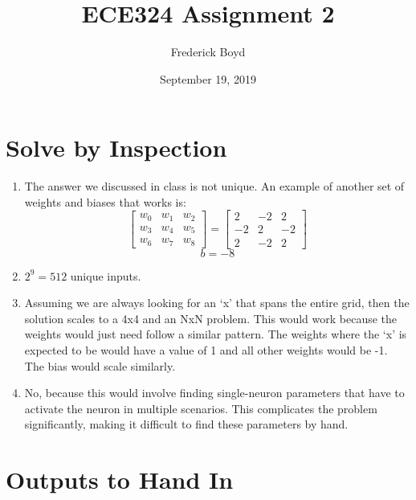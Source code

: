 \documentclass{article}
\title{ECE324 Assignment 2}
\author{Frederick Boyd}
\date{September 19, 2019}
\begin{document}
\maketitle

\section{Solve by Inspection}
\begin{enumerate}[label=\roman*.]
  \item The answer we discussed in class is not unique. An example of another
        set of weights and biases that works is:
        \begin{equation*}
          \begin{bmatrix}
            w_0 & w_1 & w_2 \\
            w_3 & w_4 & w_5 \\
            w_6 & w_7 & w_8
          \end{bmatrix}
          =
          \begin{bmatrix}
            2  & -2 & 2  \\
            -2 & 2  & -2 \\
            2  & -2 & 2
          \end{bmatrix}
        \end{equation*}
        \begin{equation*}
          b = -8
        \end{equation*}
  \item $2^9 = 512$ unique inputs.
  \item Assuming we are always looking for an `x' that spans the entire grid,
        then the solution scales to a 4x4 and an NxN problem. This would work because
        the weights would just need follow a similar pattern. The weights where the `x'
        is expected to be would have a value of 1 and all other weights would be -1.
        The bias would scale similarly.
  \item No, because this would involve finding single-neuron parameters that
        have to activate the neuron in multiple scenarios. This complicates the problem
        significantly, making it difficult to find these parameters by hand.
\end{enumerate}

\section{Outputs to Hand In}
\end{document}
